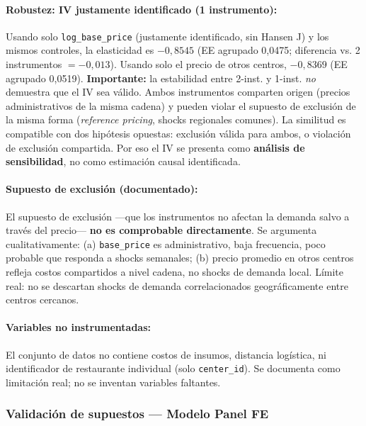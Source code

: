 \documentclass[doc, a4paper, biblatex, floatsintext, longtable, babel]{apa7}
\begin{document}
\paragraph{Robustez: IV justamente identificado (1 instrumento):} Usando solo \texttt{log\_base\_price} (justamente identificado, sin Hansen J) y los mismos controles, la elasticidad es $-0,8545$ (EE agrupado 0,0475; diferencia vs. 2 instrumentos $=-0,013$). Usando solo el precio de otros centros, $-0,8369$ (EE agrupado 0,0519). \textbf{Importante:} la estabilidad entre 2-inst. y 1-inst. \emph{no} demuestra que el IV sea v\'alido. Ambos instrumentos comparten origen (precios administrativos de la misma cadena) y pueden violar el supuesto de exclusi\'on de la misma forma (\textit{reference pricing}, shocks regionales comunes). La similitud es compatible con dos hip\'otesis opuestas: exclusi\'on v\'alida para ambos, o violaci\'on de exclusi\'on compartida. Por eso el IV se presenta como \textbf{an\'alisis de sensibilidad}, no como estimaci\'on causal identificada.

\paragraph{Supuesto de exclusi\'on (documentado):} El supuesto de exclusi\'on ---que los instrumentos no afectan la demanda salvo a trav\'es del precio--- \textbf{no es comprobable directamente}. Se argumenta cualitativamente: (a) \texttt{base\_price} es administrativo, baja frecuencia, poco probable que responda a shocks semanales; (b) precio promedio en otros centros refleja costos compartidos a nivel cadena, no shocks de demanda local. L\'imite real: no se descartan shocks de demanda correlacionados geogr\'aficamente entre centros cercanos.

\paragraph{Variables no instrumentadas:} El conjunto de datos no contiene costos de insumos, distancia log\'istica, ni identificador de restaurante individual (solo \texttt{center\_id}). Se documenta como limitaci\'on real; no se inventan variables faltantes.

\subsubsection{Validaci\'on de supuestos --- Modelo Panel FE}
\label{subsec:validacion_panel}
\end{document}
